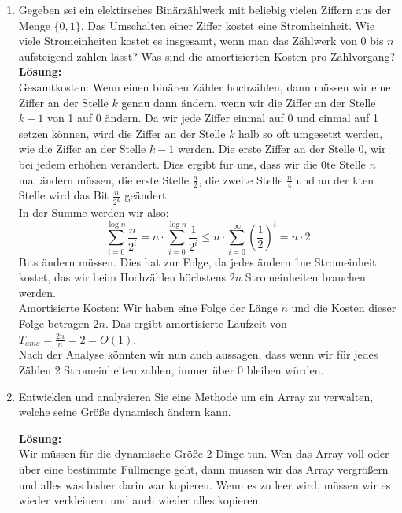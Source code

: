 \documentclass[11pt,a4paper,ngerman]{article}
\begin{document}
\begin{enumerate}[\bfseries a)]

\item Gegeben sei ein elektirsches Binärzählwerk mit beliebig vielen Ziffern aus der Menge $\{ 0, 1\}$. Das Umschalten einer Ziffer kostet eine Stromheinheit. Wie viele Stromeinheiten kostet es insgesamt, wenn man das Zählwerk von 0 bis $n$ aufsteigend zählen lässt? Was sind die amortisierten Kosten pro Zählvorgang?\\

\textbf{Lösung:}\\
Gesamtkosten: Wenn einen binären Zähler hochzählen, dann müssen wir eine Ziffer an der Stelle $k$ genau dann ändern, wenn wir die Ziffer an der Stelle $k-1$ von 1 auf 0 ändern. Da wir jede Ziffer einmal auf 0 und einmal auf 1 setzen können, wird die Ziffer an der Stelle $k$ halb so oft umgesetzt werden, wie die Ziffer an der Stelle $k-1$ werden. Die erste Ziffer an der Stelle 0, wir bei jedem erhöhen verändert. Dies ergibt für uns, dass wir die 0te Stelle $n$ mal ändern müssen, die erste Stelle $\frac{n}{2}$, die zweite Stelle $\frac{n}{4}$ und an der kten Stelle wird das Bit $\frac{n}{2^k}$ geändert.\\

In der Summe werden wir also:
$$
\sum_{i=0}^{\log n} \frac{n}{2^i} = n \cdot \sum_{i=0}^{\log n} \frac{1}{2^i} \leq n \cdot \sum_{i=0}^{\infty} \left( \frac{1}{2} \right)^i = n\cdot 2
$$
Bits ändern müssen. Dies hat zur Folge, da jedes ändern 1ne Stromeinheit kostet, das wir beim Hochzählen höchstens $2n$ Stromeinheiten brauchen werden.\\

Amortisierte Kosten: Wir haben eine Folge der Länge $n$ und die Kosten dieser Folge betragen $2n$. Das ergibt amortisierte Laufzeit von $T_{amo} = \frac{2n}{n} = 2 = O(1)$.\\

Nach der Analyse könnten wir nun auch aussagen, dass wenn wir für jedes Zählen 2 Stromeinheiten zahlen, immer über 0 bleiben würden.

\item Entwicklen und analysieren Sie eine Methode um ein Array zu verwalten, welche seine Größe dynamisch ändern kann.

\textbf{Lösung:}\\

Wir müssen für die dynamische Größe 2 Dinge tun. Wen das Array voll oder über eine bestimmte Füllmenge geht, dann müssen wir das Array vergrößern und alles was bisher darin war kopieren. Wenn es zu leer wird, müssen wir es wieder verkleinern und auch wieder alles kopieren.\\


\end{enumerate}
\end{document}
